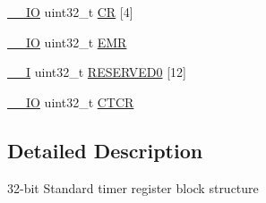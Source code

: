 \begin{DoxyCompactItemize}
\item 
\hyperlink{core__cm3_8h_aec43007d9998a0a0e01faede4133d6be}{\-\_\-\-\_\-\-I\-O} uint32\-\_\-t \hyperlink{structLPC__TIMER__T_aa352dc65884c0a7b8888736a90a4bb7b}{C\-R} \mbox{[}4\mbox{]}
\item 
\hyperlink{core__cm3_8h_aec43007d9998a0a0e01faede4133d6be}{\-\_\-\-\_\-\-I\-O} uint32\-\_\-t \hyperlink{structLPC__TIMER__T_a92df4dc0b947774e8cf040b5c2c2ae30}{E\-M\-R}
\item 
\hyperlink{core__cm3_8h_af63697ed9952cc71e1225efe205f6cd3}{\-\_\-\-\_\-\-I} uint32\-\_\-t \hyperlink{structLPC__TIMER__T_ac55f208ad800371ff9db0ba9f49ec716}{R\-E\-S\-E\-R\-V\-E\-D0} \mbox{[}12\mbox{]}
\item 
\hyperlink{core__cm3_8h_aec43007d9998a0a0e01faede4133d6be}{\-\_\-\-\_\-\-I\-O} uint32\-\_\-t \hyperlink{structLPC__TIMER__T_a8bee15636f5bce5c6d3f3fcd4d8cf513}{C\-T\-C\-R}
\end{DoxyCompactItemize}


\subsection{Detailed Description}
32-\/bit Standard timer register block structure 

